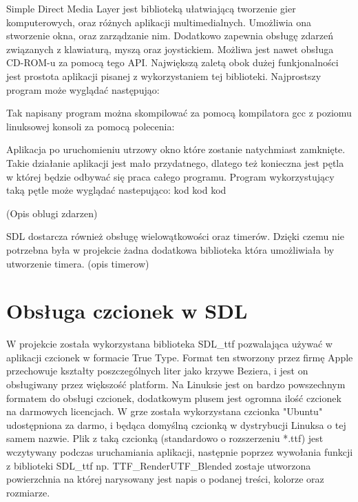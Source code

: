 Simple Direct Media Layer jest biblioteką ułatwiającą tworzenie gier komputerowych, oraz różnych aplikacji multimedialnych. Umożliwia ona stworzenie okna, oraz zarządzanie nim. Dodatkowo zapewnia obsługę zdarzeń związanych z klawiaturą, myszą oraz joystickiem. Możliwa jest nawet obsługa CD-ROM-u za pomocą tego API. Największą zaletą obok dużej funkjonalności jest prostota aplikacji pisanej z wykorzystaniem tej biblioteki. Najprostszy program może wyglądać następująo:

Tak napisany program można skompilować za pomocą kompilatora gcc z poziomu linuksowej konsoli za pomocą polecenia:

Aplikacja po uruchomieniu utrzowy okno które zostanie natychmiast zamknięte. Takie działanie aplikacji jest mało przydatnego, dlatego też konieczna jest pętla w której będzie odbywać się praca całego programu. Program wykorzystujący taką pętle może wyglądać nastepująco:
kod kod kod 

(Opis oblugi zdarzen)

SDL dostarcza również obsługę wielowątkowości oraz timerów. Dzięki czemu nie potrzebna była w projekcie żadna dodatkowa biblioteka która umożliwiała by utworzenie timera. (opis timerow)

\section{Obsługa czcionek w SDL}
W projekcie została wykorzystana biblioteka SDL\_ttf pozwalająca używać w aplikacji czcionek w formacie True Type. Format ten stworzony przez firmę Apple przechowuje kształty poszczególnych liter jako krzywe Beziera, i jest on obsługiwany przez większość platform. Na Linuksie jest on bardzo powszechnym formatem do obsługi czcionek, dodatkowym plusem jest ogromna ilość czcionek na darmowych licencjach. W grze została wykorzystana czcionka "Ubuntu" udostępniona za darmo, i będąca domyślną czcionką w dystrybucji Linuksa o tej samem nazwie. Plik z taką czcionką (standardowo o rozszerzeniu *.ttf) jest wczytywany podczas uruchamiania aplikacji, następnie poprzez wywołania funkcji z biblioteki SDL\_ttf np. TTF\_RenderUTF\_Blended zostaje utworzona powierzchnia na której narysowany jest napis o podanej treści, kolorze oraz rozmiarze. 


